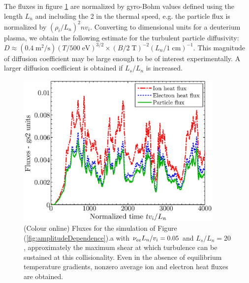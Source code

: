 \documentclass{jpp}
\begin{document}
The fluxes in figure \ref{fig:fluxes} are normalized by gyro-Bohm values defined using the length $L_n$ and including the 2 in the thermal speed, e.g.
the particle flux is normalized by $(\rho_i / L_n)^2 n v_i$.
Converting to dimensional units for a deuterium plasma, we obtain the following estimate for the turbulent particle diffusivity:
$D \approx \left( 0.4 \mathrm{ \;m^2/s}\right)
\left(T / 500 \mathrm{\;eV}\right)^{3/2}
\times
\left(B/2\mathrm{\;T}\right)^{-2} \left( L_n / 1 \mathrm{\;cm}\right)^{-1}$.
This magnitude of diffusion coefficient may be large enough to be of interest experimentally.
A larger diffusion coefficient is obtained if $L_s/L_n$ is increased.

\begin{figure}
\centerline{\includegraphics[width=4in]{fig9.eps}}
\caption{(Colour online)
Fluxes for the simulation of Figure (\ref{fig:amplitudeDependence}).a with  $\nu_{ee} L_n / v_i = 0.05$ and
$L_s/L_n=20$, approximately the maximum shear at which turbulence can be sustained at this collisionality.
Even in the absence of equilibrium temperature gradients, nonzero average ion and electron heat fluxes
are obtained.
\label{fig:fluxes}}
\end{figure}
\end{document}
